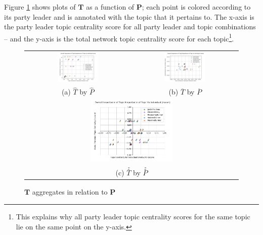 Figure \ref{fig:topic_centrality} shows plots of $\textbf{T}$ as a function of
$\textbf{P}$; each point is colored according to its party leader and is
annotated with the topic that it pertains to. The x-axis is the party leader
topic centrality score for all party leader and topic combinations -- and the
y-axis is the total network topic centrality score for each topic\footnote{This
explains why all party leader topic centrality scores for the same topic lie on
the same point on the y-axis.}.

\begin{figure}
    \centering
    \begin{tabular}{cc}
    \includegraphics[width=0.40\textwidth]{Figures/sum_opposing_centrality_chart_(expanded)} &
    \includegraphics[width=0.40\textwidth]{Figures/mean_opposing_centrality_chart_(expanded)} \\
    (a)  \textbf{$\hat{T}$} by \textbf{$\hat{P}$} & (b) \textbf{$\overline{T}$} by \textbf{$\overline{P}$} \\[6pt]
    \multicolumn{2}{c}{\includegraphics[width=0.40\textwidth]{Figures/zscore_opposing_centrality_chart_(expanded)}}\\
    \multicolumn{2}{c}{(c) \textbf{$\stackrel{z}{T}$} by \textbf{$\stackrel{z}{P}$}}
    \end{tabular}
    \caption[$\textbf{T}$ aggregates in relation to $\textbf{P}$]{$\textbf{T}$ aggregates in relation to $\textbf{P}$}
    \label{fig:topic_centrality}
\end{figure}

